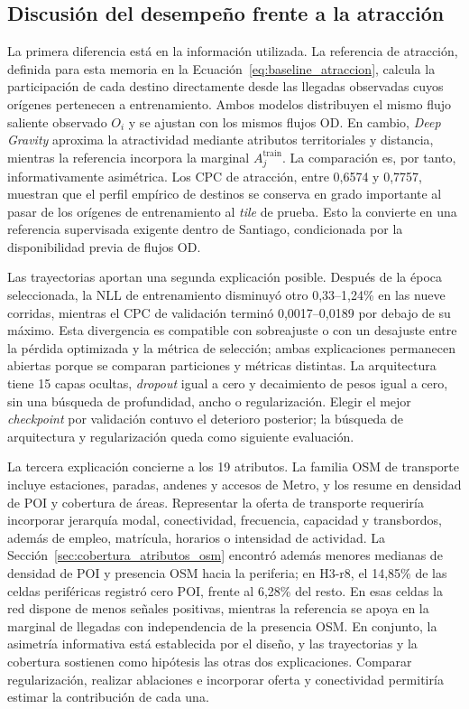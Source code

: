 \subsection{Discusión del desempeño frente a la atracción}
\label{sec:discusion_atraccion}

La primera diferencia está en la información utilizada. La referencia de atracción, definida para esta memoria en la Ecuación~\ref{eq:baseline_atraccion}, calcula la participación de cada destino directamente desde las llegadas observadas cuyos orígenes pertenecen a entrenamiento. Ambos modelos distribuyen el mismo flujo saliente observado $O_i$ y se ajustan con los mismos flujos OD. En cambio, \textit{Deep Gravity} aproxima la atractividad mediante atributos territoriales y distancia, mientras la referencia incorpora la marginal $A_j^{\mathrm{train}}$. La comparación es, por tanto, informativamente asimétrica. Los CPC de atracción, entre 0,6574 y 0,7757, muestran que el perfil empírico de destinos se conserva en grado importante al pasar de los orígenes de entrenamiento al \textit{tile} de prueba. Esto la convierte en una referencia supervisada exigente dentro de Santiago, condicionada por la disponibilidad previa de flujos OD.

Las trayectorias aportan una segunda explicación posible. Después de la época seleccionada, la NLL de entrenamiento disminuyó otro 0,33--1,24\% en las nueve corridas, mientras el CPC de validación terminó 0,0017--0,0189 por debajo de su máximo. Esta divergencia es compatible con sobreajuste o con un desajuste entre la pérdida optimizada y la métrica de selección; ambas explicaciones permanecen abiertas porque se comparan particiones y métricas distintas. La arquitectura tiene 15 capas ocultas, \textit{dropout} igual a cero y decaimiento de pesos igual a cero, sin una búsqueda de profundidad, ancho o regularización. Elegir el mejor \textit{checkpoint} por validación contuvo el deterioro posterior; la búsqueda de arquitectura y regularización queda como siguiente evaluación.

La tercera explicación concierne a los 19 atributos. La familia OSM de transporte incluye estaciones, paradas, andenes y accesos de Metro, y los resume en densidad de POI y cobertura de áreas. Representar la oferta de transporte requeriría incorporar jerarquía modal, conectividad, frecuencia, capacidad y transbordos, además de empleo, matrícula, horarios o intensidad de actividad. La Sección~\ref{sec:cobertura_atributos_osm} encontró además menores medianas de densidad de POI y presencia OSM hacia la periferia; en H3-r8, el 14,85\% de las celdas periféricas registró cero POI, frente al 6,28\% del resto. En esas celdas la red dispone de menos señales positivas, mientras la referencia se apoya en la marginal de llegadas con independencia de la presencia OSM. En conjunto, la asimetría informativa está establecida por el diseño, y las trayectorias y la cobertura sostienen como hipótesis las otras dos explicaciones. Comparar regularización, realizar ablaciones e incorporar oferta y conectividad permitiría estimar la contribución de cada una.

